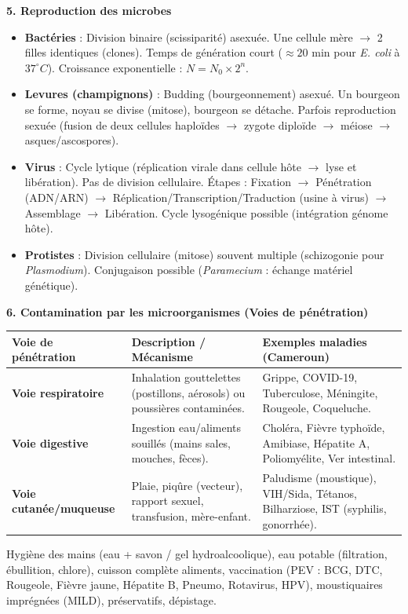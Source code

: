 \documentclass[11pt]{article}
\newcommand{\cle}[1]{{\popxbold\color{popdark}#1}}
\begin{document}
\begin{bilan}
\textbf{5. Reproduction des microbes}
\begin{itemize}
    \item \textbf{Bactéries} : \cle{Division binaire (scissiparité)} asexuée. Une cellule mère $\to$ 2 filles identiques (clones). Temps de génération court ($\approx 20$ min pour \emph{E. coli} à $37^\circ C$). Croissance exponentielle : $N = N_0 \times 2^n$.
    \item \textbf{Levures (champignons)} : \cle{Budding (bourgeonnement)} asexué. Un bourgeon se forme, noyau se divise (mitose), bourgeon se détache. Parfois reproduction sexuée (fusion de deux cellules haploïdes $\to$ zygote diploïde $\to$ méiose $\to$ asques/ascospores).
    \item \textbf{Virus} : \cle{Cycle lytique} (réplication virale dans cellule hôte $\to$ lyse et libération). Pas de division cellulaire. Étapes : Fixation $\to$ Pénétration (ADN/ARN) $\to$ Réplication/Transcription/Traduction (usine à virus) $\to$ Assemblage $\to$ Libération. Cycle lysogénique possible (intégration génome hôte).
    \item \textbf{Protistes} : Division cellulaire (mitose) souvent multiple (schizogonie pour \emph{Plasmodium}). Conjugaison possible (\emph{Paramecium} : échange matériel génétique).
\end{itemize}

\textbf{6. Contamination par les microorganismes (Voies de pénétration)}
\begin{center}
\begin{tabularx}{\linewidth}{|l|X|l|}\hline
\rowcolor{popblueL}
\textbf{Voie de pénétration} & \textbf{Description / Mécanisme} & \textbf{Exemples maladies (Cameroun)} \\ \hline
\textbf{Voie respiratoire} & Inhalation gouttelettes (postillons, aérosols) ou poussières contaminées. & Grippe, COVID-19, Tuberculose, Méningite, Rougeole, Coqueluche. \\ \hline
\textbf{Voie digestive} & Ingestion eau/aliments souillés (mains sales, mouches, fèces). & Choléra, Fièvre typhoïde, Amibiase, Hépatite A, Poliomyélite, Ver intestinal. \\ \hline
\textbf{Voie cutanée/muqueuse} & Plaie, piqûre (vecteur), rapport sexuel, transfusion, mère-enfant. & Paludisme (moustique), VIH/Sida, Tétanos, Bilharziose, IST (syphilis, gonorrhée). \\ \hline
\end{tabularx}
\end{center}
\begin{propriete}
Hygiène des mains (eau + savon / gel hydroalcoolique), eau potable (filtration, ébullition, chlore), cuisson complète aliments, vaccination (PEV : BCG, DTC, Rougeole, Fièvre jaune, Hépatite B, Pneumo, Rotavirus, HPV), moustiquaires imprégnées (MILD), préservatifs, dépistage.
\end{propriete}
\end{bilan}
\end{document}
